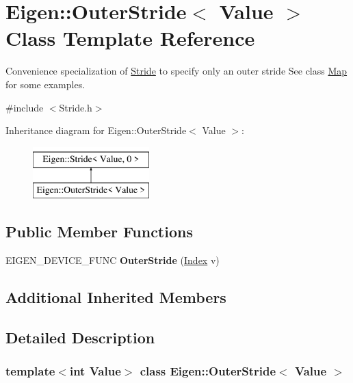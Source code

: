 \hypertarget{class_eigen_1_1_outer_stride}{}\section{Eigen\+::Outer\+Stride$<$ Value $>$ Class Template Reference}
\label{class_eigen_1_1_outer_stride}


Convenience specialization of \mbox{\hyperlink{class_eigen_1_1_stride}{Stride}} to specify only an outer stride See class \mbox{\hyperlink{class_eigen_1_1_map}{Map}} for some examples.  




{\ttfamily \#include $<$Stride.\+h$>$}

Inheritance diagram for Eigen\+::Outer\+Stride$<$ Value $>$\+:\begin{figure}[H]
\begin{center}
\leavevmode
\includegraphics[height=2.000000cm]{class_eigen_1_1_outer_stride}
\end{center}
\end{figure}
\subsection*{Public Member Functions}
\begin{DoxyCompactItemize}
\item 
\mbox{\label{class_eigen_1_1_outer_stride_ac095c1e78785f794d07a6ba63c29c86c}} 
E\+I\+G\+E\+N\+\_\+\+D\+E\+V\+I\+C\+E\+\_\+\+F\+U\+NC {\bfseries Outer\+Stride} (\mbox{\hyperlink{class_eigen_1_1_stride_a96c2dfb0ce43fd8e19adcdf6094f5f63}{Index}} v)
\end{DoxyCompactItemize}
\subsection*{Additional Inherited Members}


\subsection{Detailed Description}
\subsubsection*{template$<$int Value$>$\newline
class Eigen\+::\+Outer\+Stride$<$ Value $>$}

